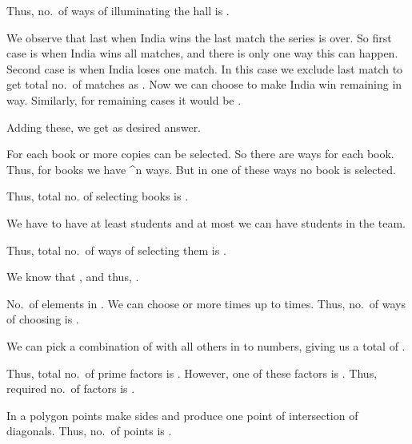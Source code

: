   Thus, no.\ of ways of illuminating the hall is .
\item We observe that last when India wins the last match the series is over. So first case is when India
  wins all  matches, and there is only one way this can happen. Second case is when India loses one
  match. In this case we exclude last match to get total no.\ of matches as . Now we can choose to make
  India win remaining  in  way. Similarly, for remaining cases it would be .

  Adding these, we get  as desired answer.
\item For each book  or more copies can be selected. So there are  ways for each book. Thus,
  for  books we have ^n ways. But in one of these ways no book is selected.

  Thus, total no. of selecting books is .
\item We have to have at least  students and at most we can have  students in the team.

  Thus, total no.\ of ways of selecting them is .

  We know that , and thus, .
\item No.\ of elements in . We can choose  or more times up to
   times. Thus, no.\ of ways of choosing  is .

  We can pick a combination of  with all others in  to  numbers, giving us a total of
  .

  Thus, total no.\ of prime factors is . However, one of these factors is . Thus,
  required no.\ of factors is .
\item In a polygon  points make  sides and produce one point of intersection of 
  diagonals. Thus, no.\ of points is .

